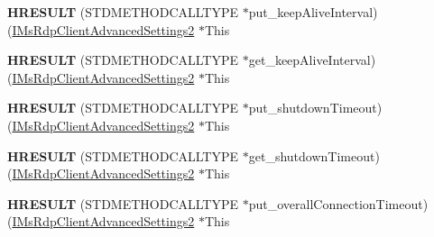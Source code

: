 \begin{DoxyCompactItemize}
\mbox{\label{struct_m_s_t_s_c_lib_1_1_i_ms_rdp_client_advanced_settings2_vtbl_aad2f14c07997836291c07507ac00c0ed}} 
{\bfseries H\+R\+E\+S\+U\+LT} (S\+T\+D\+M\+E\+T\+H\+O\+D\+C\+A\+L\+L\+T\+Y\+PE $\ast$put\+\_\+keep\+Alive\+Interval)(\hyperlink{interface_m_s_t_s_c_lib_1_1_i_ms_rdp_client_advanced_settings2}{I\+Ms\+Rdp\+Client\+Advanced\+Settings2} $\ast$This
\item 
\mbox{\label{struct_m_s_t_s_c_lib_1_1_i_ms_rdp_client_advanced_settings2_vtbl_ac203c8d5f8925f9cad9b075c07d20a86}} 
{\bfseries H\+R\+E\+S\+U\+LT} (S\+T\+D\+M\+E\+T\+H\+O\+D\+C\+A\+L\+L\+T\+Y\+PE $\ast$get\+\_\+keep\+Alive\+Interval)(\hyperlink{interface_m_s_t_s_c_lib_1_1_i_ms_rdp_client_advanced_settings2}{I\+Ms\+Rdp\+Client\+Advanced\+Settings2} $\ast$This
\item 
\mbox{\label{struct_m_s_t_s_c_lib_1_1_i_ms_rdp_client_advanced_settings2_vtbl_a5db8a0d0f53413c421fc8b9c545b79f3}} 
{\bfseries H\+R\+E\+S\+U\+LT} (S\+T\+D\+M\+E\+T\+H\+O\+D\+C\+A\+L\+L\+T\+Y\+PE $\ast$put\+\_\+shutdown\+Timeout)(\hyperlink{interface_m_s_t_s_c_lib_1_1_i_ms_rdp_client_advanced_settings2}{I\+Ms\+Rdp\+Client\+Advanced\+Settings2} $\ast$This
\item 
\mbox{\label{struct_m_s_t_s_c_lib_1_1_i_ms_rdp_client_advanced_settings2_vtbl_a45bb36b6d37345d748a9b8601d139bcf}} 
{\bfseries H\+R\+E\+S\+U\+LT} (S\+T\+D\+M\+E\+T\+H\+O\+D\+C\+A\+L\+L\+T\+Y\+PE $\ast$get\+\_\+shutdown\+Timeout)(\hyperlink{interface_m_s_t_s_c_lib_1_1_i_ms_rdp_client_advanced_settings2}{I\+Ms\+Rdp\+Client\+Advanced\+Settings2} $\ast$This
\item 
\mbox{\label{struct_m_s_t_s_c_lib_1_1_i_ms_rdp_client_advanced_settings2_vtbl_ad626bd524fe35c6aa57e7d8c60301428}} 
{\bfseries H\+R\+E\+S\+U\+LT} (S\+T\+D\+M\+E\+T\+H\+O\+D\+C\+A\+L\+L\+T\+Y\+PE $\ast$put\+\_\+overall\+Connection\+Timeout)(\hyperlink{interface_m_s_t_s_c_lib_1_1_i_ms_rdp_client_advanced_settings2}{I\+Ms\+Rdp\+Client\+Advanced\+Settings2} $\ast$This
\item 
\mbox{\label{struct_m_s_t_s_c_lib_1_1_i_ms_rdp_client_advanced_settings2_vtbl_a60f072f7d77aaa597830ea12d69857d5}} 

\end{DoxyCompactItemize}
